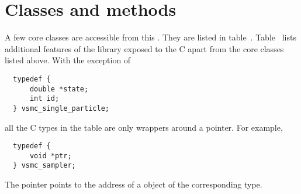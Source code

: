 \section{Classes and methods}
\label{app:sec:Classes and methods}

A few core classes are accessible from this \api. They are listed in
table~. Table~ lists additional
features of the library exposed to the C \api apart from the core classes
listed above. With the exception of
\begin{Verbatim}
  typedef {
      double *state;
      int id;
  } vsmc_single_particle;
\end{Verbatim}
all the C types in the table are only wrappers around a pointer. For example,
\begin{Verbatim}
  typedef {
      void *ptr;
  } vsmc_sampler;
\end{Verbatim}
The pointer points to the address of a \cpp object of the corresponding type.

